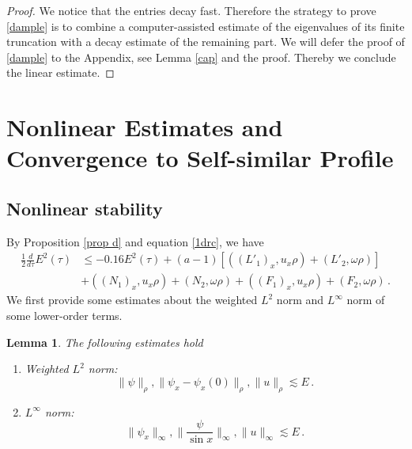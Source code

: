 \documentclass[12pt]{caltech_thesis}
\newtheorem{lemma}[theorem]{Lemma}
\numberwithin{equation}{section}
\begin{document}
\begin{proof}
We notice that the entries decay fast. {Therefore the strategy to prove \eqref{dample} is to combine a computer-assisted estimate of the eigenvalues of its finite truncation with a decay estimate of the remaining part. We will defer the proof of \eqref{dample} to the Appendix, see Lemma \ref{cap} and the proof}. Thereby we conclude the linear estimate.
\end{proof}


\section{Nonlinear Estimates and Convergence to Self-similar Profile}
\label{nonlinearest}
\subsection{Nonlinear stability}
By Proposition \ref{prop d} and equation \eqref{1drc}, we have \begin{equation}
\label{nonlinear}
    \begin{aligned}\frac{1}{2}\frac{d}{d\tau}E^2(\tau)&\leq -0.16E^2(\tau)+(a-1)[((L'_1)_x,u_x\rho)+(L'_2,\omega\rho)]\\&+((N_1)_x,u_x\rho)+(N_2,\omega\rho)+((F_1)_x,u_x\rho)+(F_2,\omega\rho)\,.\end{aligned}
\end{equation}
We first provide some estimates about the weighted $L^2$ norm and $L^{\infty}$ norm of some lower-order terms.
\begin{lemma}
\label{lotb}
The following estimates hold
\begin{enumerate}
    \item Weighted $L^2$ norm: $$\|\psi\|_{\rho},\|\psi_x-\psi_x(0)\|_{\rho},\|u\|_{\rho}\lesssim E\,.$$
    \item $L^{\infty}$ norm: $$\|\psi_x\|_{\infty},\|\frac{\psi}{\sin x}\|_{\infty},\|u\|_{\infty}\lesssim E\,.$$
\end{enumerate}
   
\end{lemma}
\end{document}
